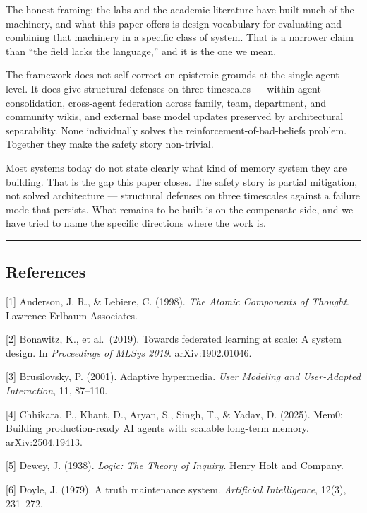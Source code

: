 \documentclass[
  11pt,
]{article}
\begin{document}
The honest framing: the labs and the academic literature have built much
of the machinery, and what this paper offers is design vocabulary for
evaluating and combining that machinery in a specific class of system.
That is a narrower claim than ``the field lacks the language,'' and it
is the one we mean.

The framework does not self-correct on epistemic grounds at the
single-agent level. It does give structural defenses on three timescales
--- within-agent consolidation, cross-agent federation across family,
team, department, and community wikis, and external base model updates
preserved by architectural separability. None individually solves the
reinforcement-of-bad-beliefs problem. Together they make the safety
story non-trivial.

Most systems today do not state clearly what kind of memory system they
are building. That is the gap this paper closes. The safety story is
partial mitigation, not solved architecture --- structural defenses on
three timescales against a failure mode that persists. What remains to
be built is on the compensate side, and we have tried to name the
specific directions where the work is.

\begin{center}\rule{0.5\linewidth}{0.5pt}\end{center}

\hypertarget{references}{%
\subsection{References}\label{references}}

{[}1{]} Anderson, J. R., \& Lebiere, C. (1998). \emph{The Atomic
Components of Thought}. Lawrence Erlbaum Associates.

{[}2{]} Bonawitz, K., et al.~(2019). Towards federated learning at
scale: A system design. In \emph{Proceedings of MLSys 2019}.
arXiv:1902.01046.

{[}3{]} Brusilovsky, P. (2001). Adaptive hypermedia. \emph{User Modeling
and User-Adapted Interaction}, 11, 87--110.

{[}4{]} Chhikara, P., Khant, D., Aryan, S., Singh, T., \& Yadav, D.
(2025). Mem0: Building production-ready AI agents with scalable
long-term memory. arXiv:2504.19413.

{[}5{]} Dewey, J. (1938). \emph{Logic: The Theory of Inquiry}. Henry
Holt and Company.

{[}6{]} Doyle, J. (1979). A truth maintenance system. \emph{Artificial
Intelligence}, 12(3), 231--272.
\end{document}
